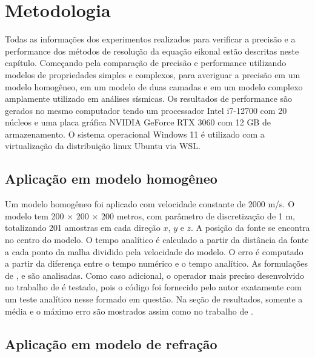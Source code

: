 \chapter{Metodologia}
\label{ch:metodologia}

Todas as informações dos experimentos realizados para verificar a precisão e a performance dos métodos de resolução da equação eikonal estão descritas neste capítulo. Começando pela comparação de precisão e performance utilizando modelos de propriedades simples e complexos, para averiguar a precisão em um modelo homogêneo, em um modelo de duas camadas e em um modelo complexo amplamente utilizado em análises sísmicas. Os resultados de performance são gerados no mesmo computador tendo um processador Intel i7-12700 com 20 núcleos e uma placa gráfica NVIDIA GeForce RTX 3060 com 12 GB de armazenamento. O sistema operacional Windows 11 é utilizado com a virtualização da distribuição linux Ubuntu via WSL.  

\section{Aplicação em modelo homogêneo}

Um modelo homogêneo foi aplicado com velocidade constante de 2000 m/s. O modelo tem 200 $\times$ 200 $\times$ 200 metros, com parâmetro de discretização de 1 m, totalizando 201 amostras em cada direção $x$, $y$ e $z$. A posição da fonte se encontra no centro do modelo. O tempo analítico é calculado a partir da distância da fonte a cada ponto da malha dividido pela velocidade do modelo. O erro é computado a partir da diferença entre o tempo numérico e o tempo analítico. As formulações de ,  e  são analisadas. Como caso adicional, o operador mais preciso desenvolvido no trabalho de  é testado, pois o código foi fornecido pelo autor exatamente com um teste analítico nesse formado em questão. Na seção de resultados, somente a média e o máximo erro são mostrados assim como no trabalho de . 

\section{Aplicação em modelo de refração}


